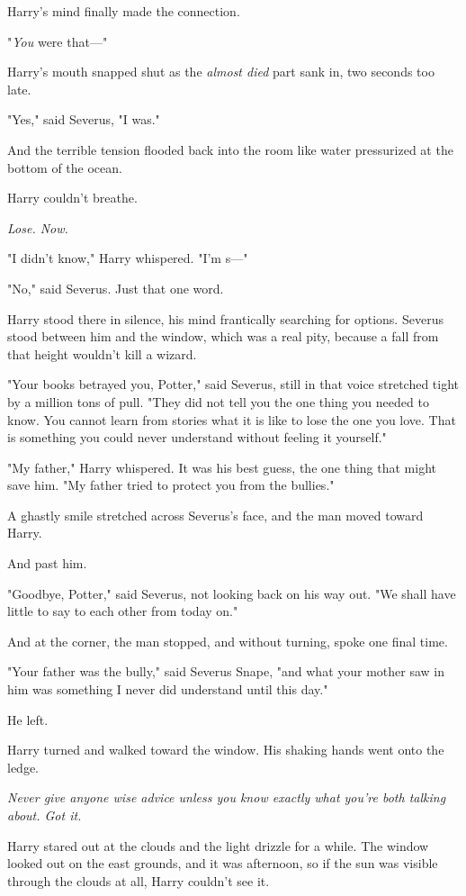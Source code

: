 Harry's mind finally made the connection.

"\emph{You} were that---"

Harry's mouth snapped shut as the \emph{almost died} part sank in, two seconds 
too late.

"Yes," said Severus, "I was."

And the terrible tension flooded back into the room like water pressurized at 
the bottom of the ocean.

Harry couldn't breathe.

\emph{Lose. Now.}

"I didn't know," Harry whispered. "I'm s---"

"No," said Severus. Just that one word.

Harry stood there in silence, his mind frantically searching for options. 
Severus stood between him and the window, which was a real pity, because a fall 
from that height wouldn't kill a wizard.

"Your books betrayed you, Potter," said Severus, still in that voice stretched 
tight by a million tons of pull. "They did not tell you the one thing you 
needed to know. You cannot learn from stories what it is like to lose the one 
you love. That is something you could never understand without feeling it 
yourself."

"My father," Harry whispered. It was his best guess, the one thing that might 
save him. "My father tried to protect you from the bullies."

A ghastly smile stretched across Severus's face, and the man moved toward Harry.

And past him.

"Goodbye, Potter," said Severus, not looking back on his way out. "We shall 
have little to say to each other from today on."

And at the corner, the man stopped, and without turning, spoke one final time.

"Your father was the bully," said Severus Snape, "and what your mother saw in 
him was something I never did understand until this day."

He left.

Harry turned and walked toward the window. His shaking hands went onto the 
ledge.

\emph{Never give anyone wise advice unless you know exactly what you're both 
talking about. Got it.}

Harry stared out at the clouds and the light drizzle for a while. The window 
looked out on the east grounds, and it was afternoon, so if the sun was visible 
through the clouds at all, Harry couldn't see it.

